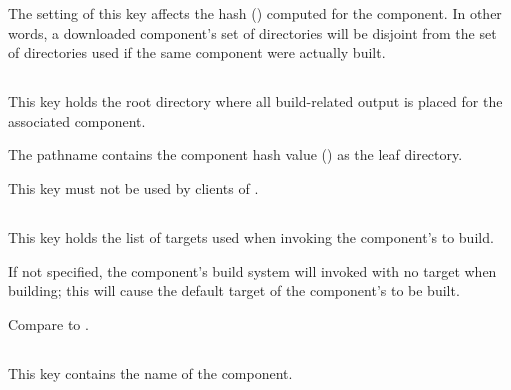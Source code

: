 The setting of this key affects the hash ()
computed for the component.  In other words, a downloaded component's
set of directories will be disjoint from the set of directories used
if the same component were actually built.


\subsection{}\label{variables:build-root-directory}

This key holds the root directory where all build-related output is
placed for the associated component.

The pathname contains the component hash value ()
as the leaf directory.

This key must not be used by clients of \lmsbw.


\subsection{}\label{variables:build-target}

This key holds the list of targets used when invoking the component's
\makefile to build.

If not specified, the component's build system will invoked with no
target when building; this will cause the default target of the
component's \makefile to be built.

Compare to .


\subsection{}\label{variables:component}

This key contains the name of the component.


\subsection{}\label{variables:configuration-file}

